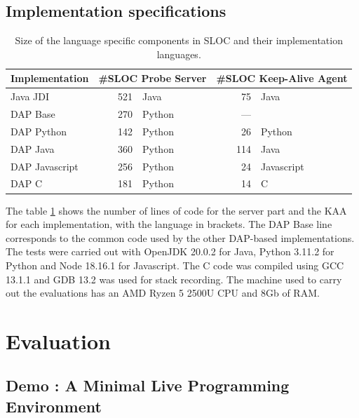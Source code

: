 \documentclass[english,submission]{programming}
\begin{document}
\subsection{Implementation specifications}

\begin{table}[!ht]
  \noindent\setlength\tabcolsep{4pt}%
  \begin{tabularx}{\textwidth}{X r X r X}
      \toprule
      Implementation & \multicolumn{2}{l}{\#SLOC Probe Server} & \multicolumn{2}{l}{\#SLOC Keep-Alive Agent} \\
      \midrule
      Java JDI & 521 & Java & 75 & Java \\ 
      DAP Base & 270  & Python & --- & \\ 
      DAP Python & 142 & Python & 26 & Python \\ 
      DAP Java & 360 & Python & 114 & Java \\ 
      DAP Javascript & 256 & Python & 24 & Javascript \\ 
      DAP C & 181 & Python & 14 & C \\
      \bottomrule
  \end{tabularx}
  \caption{Size of the language specific components in SLOC and their implementation languages.}
  \label{tab:sloc}
\end{table}

The table \ref{tab:sloc} shows the number of lines of code for the server part and the KAA for each implementation, with the language in brackets. The DAP Base line corresponds to the common code used by the other DAP-based implementations.
The tests were carried out with OpenJDK 20.0.2 for Java, Python 3.11.2 for Python and Node 18.16.1 for Javascript. The C code was compiled using GCC 13.1.1 and GDB 13.2 was used for stack recording. The machine used to carry out the evaluations has an AMD Ryzen 5 2500U CPU and 8Gb of RAM.

\section{Evaluation}
\label{sec:evaluation}
\subsection{Demo : A Minimal Live Programming Environment}
\label{sec:demo-small-c}
\end{document}
